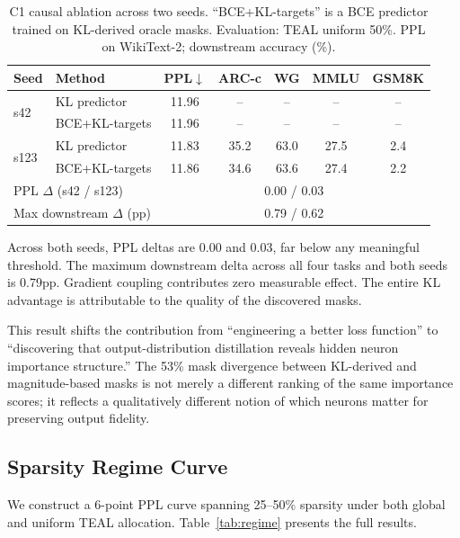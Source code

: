 \documentclass[11pt,a4paper]{article}
\begin{document}
\begin{table}[h]
\centering
\small
\caption{C1 causal ablation across two seeds. ``BCE+KL-targets'' is a BCE predictor trained on KL-derived oracle masks. Evaluation: TEAL uniform 50\%. PPL on WikiText-2; downstream accuracy (\%).}
\label{tab:c1}
\begin{tabular}{llccccc}
\toprule
\textbf{Seed} & \textbf{Method} & \textbf{PPL}$\downarrow$ & \textbf{ARC-c} & \textbf{WG} & \textbf{MMLU} & \textbf{GSM8K} \\
\midrule
\multirow{2}{*}{s42} & KL predictor & 11.96 & -- & -- & -- & -- \\
 & BCE+KL-targets & 11.96 & -- & -- & -- & -- \\
\midrule
\multirow{2}{*}{s123} & KL predictor & 11.83 & 35.2 & 63.0 & 27.5 & 2.4 \\
 & BCE+KL-targets & 11.86 & 34.6 & 63.6 & 27.4 & 2.2 \\
\midrule
\multicolumn{2}{l}{PPL $\Delta$ (s42 / s123)} & \multicolumn{5}{c}{0.00 / 0.03} \\
\multicolumn{2}{l}{Max downstream $\Delta$ (pp)} & \multicolumn{5}{c}{0.79 / 0.62} \\
\bottomrule
\end{tabular}
\end{table}

Across both seeds, PPL deltas are 0.00 and 0.03, far below any meaningful threshold.
The maximum downstream delta across all four tasks and both seeds is 0.79pp.
Gradient coupling contributes zero measurable effect.
The entire KL advantage is attributable to the quality of the discovered masks.

This result shifts the contribution from ``engineering a better loss function'' to ``discovering that output-distribution distillation reveals hidden neuron importance structure.''
The 53\% mask divergence between KL-derived and magnitude-based masks is not merely a different ranking of the same importance scores; it reflects a qualitatively different notion of which neurons matter for preserving output fidelity.

\subsection{Sparsity Regime Curve}
\label{sec:regime}

We construct a 6-point PPL curve spanning 25--50\% sparsity under both global and uniform TEAL allocation.
Table~\ref{tab:regime} presents the full results.
\end{document}
